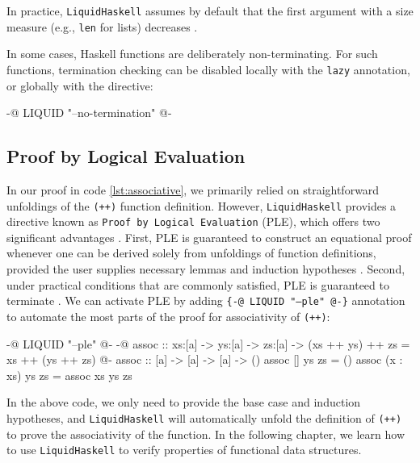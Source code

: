 In practice, \texttt{LiquidHaskell} assumes by default that the first argument with a size measure (e.g., \texttt{len} for lists) decreases \cite{vazou_liquidhaskell_2014}.

In some cases, Haskell functions are deliberately non-terminating.
For such functions, termination checking can be disabled locally with the \texttt{lazy} annotation, or globally with the directive:

\begin{code}
	{-@ LIQUID "--no-termination" @-}
\end{code}

\subsection{Proof by Logical Evaluation}
In our proof in code \ref{lst:associative}, we primarily relied on straightforward unfoldings of the \texttt{(++)} function definition.
However, \texttt{LiquidHaskell} provides a directive known as \texttt{Proof by Logical Evaluation} (PLE), which offers two significant advantages \cite{vazou2018}.
First, PLE is guaranteed to construct an equational proof whenever one can be derived solely from unfoldings of function definitions, provided the user supplies necessary lemmas and induction hypotheses \cite{vazou2018}.
Second, under practical conditions that are commonly satisfied, PLE is guaranteed to terminate \cite{vazou2018}.
We can activate PLE by adding \texttt{\{-@ LIQUID "---ple" @-\}} annotation to automate the most parts of the proof for associativity of \texttt{(++)}:

\begin{code}
	{-@ LIQUID "--ple" @-}
	{-@ assoc :: xs:[a] -> ys:[a] -> zs:[a]
	-> { (xs ++ ys) ++ zs = xs ++ (ys ++ zs) } @-}
	assoc :: [a] -> [a] -> [a] -> ()
	assoc [] ys zs = ()
	assoc (x : xs) ys zs = assoc xs ys zs
\end{code}

In the above code, we only need to provide the base case and induction hypotheses, and
\texttt{LiquidHaskell} will automatically unfold the definition of \texttt{(++)} to prove the associativity of the function.
In the following chapter, we learn how to use \texttt{LiquidHaskell} to verify properties of functional data structures.
